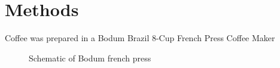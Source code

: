 \section{Methods}
\begin{outline}[enumerate]
\1 Coffee was prepared in a Bodum Brazil 8-Cup French Press Coffee Maker
\end{outline}
\begin{figure}
    
    \caption{Schematic of Bodum french press}
    \label{fig:press_diagram}
\end{figure}

